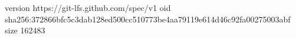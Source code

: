 version https://git-lfs.github.com/spec/v1
oid sha256:372866bfc5c3dab128ed500cc510773be4aa79119e614d46c92fa00275003abf
size 162483
